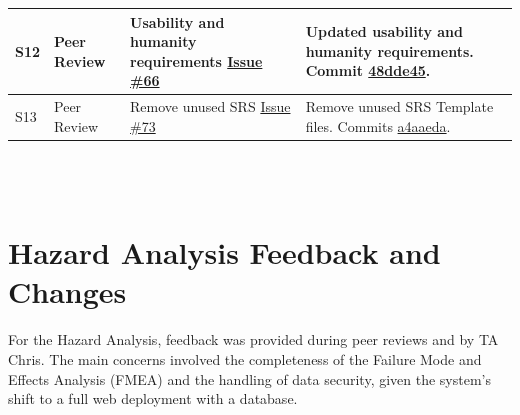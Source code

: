 \documentclass{article}
\begin{document}
\begin{longtable}{p{} p{} p{} p{}}
S12 & Peer Review & Usability and humanity requirements \newline \href{https://github.com/The-Crazy-Four-Games/Crazy_1-0s_Game/issues/66}{Issue \#66} & Updated usability and humanity requirements. \newline Commit \href{https://github.com/The-Crazy-Four-Games/Crazy_1-0s_Game/commit/48dde45c8a39535165cfe323ac529d9719e2c5fe}{48dde45}. \\
\midrule

S13 & Peer Review & Remove unused SRS \newline \href{https://github.com/The-Crazy-Four-Games/Crazy_1-0s_Game/issues/73}{Issue \#73} & Remove unused SRS Template files. \newline Commits \href{https://github.com/The-Crazy-Four-Games/Crazy_1-0s_Game/commit/a4aaeda385e63fe944cffd3b93879ab9cbec5912}{a4aaeda}. \\

\end{longtable}\\\\

\section{Hazard Analysis Feedback and Changes}

For the Hazard Analysis, feedback was provided during peer reviews and by TA Chris. The main concerns involved the completeness of the Failure Mode and Effects Analysis (FMEA) and the handling of data security, given the system's shift to a full web deployment with a database.
\end{document}
